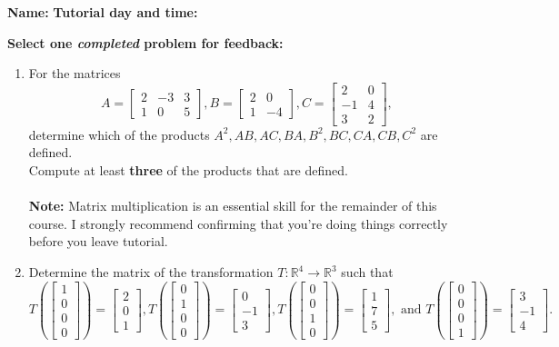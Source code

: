 \documentclass[12pt]{article}
\newcommand{\R}{\mathbb{R}}
\newcommand{\bbm}{\begin{bmatrix}}
\newcommand{\ebm}{\end{bmatrix}}
\begin{document}
{\bf \large Name:} \hspace{2.5in} {\bf Tutorial day and time:}

\bigskip

{\bf Select {\bf one} {\em completed} problem for feedback:}

\bigskip


\thispagestyle{fancy}
 \begin{enumerate}
 
\item For the matrices
\[
 A = \bbm 2&-3&3\\1&0&5\ebm, B = \bbm 2&0\\1&-4\ebm, C = \bbm 2&0\\-1&4\\3&2\ebm,
\]
determine which of the products $A^2, AB, AC, BA, B^2, BC, CA, CB, C^2$ are defined.\\
Compute at least {\bf three} of the products that are defined.\\
\\
{\bf Note:} Matrix multiplication is an essential skill for the remainder of this course. I strongly recommend confirming that you're doing things correctly before you leave tutorial.

\pagebreak

\item Determine the matrix of the transformation $T:\R^4\to \R^3$ such that
\[
 T\left(\bbm 1\\0\\0\\0\ebm\right) = \bbm 2\\0\\1\ebm, T\left(\bbm 0\\1\\0\\0\ebm\right) = \bbm 0\\-1\\3\ebm, T\left(\bbm 0\\0\\1\\0\ebm\right) = \bbm 1\\7\\5\ebm, \text{ and } T\left(\bbm 0\\0\\0\\1\ebm\right) = \bbm 3\\-1\\4\ebm.
\]



\end{enumerate}
\end{document}
